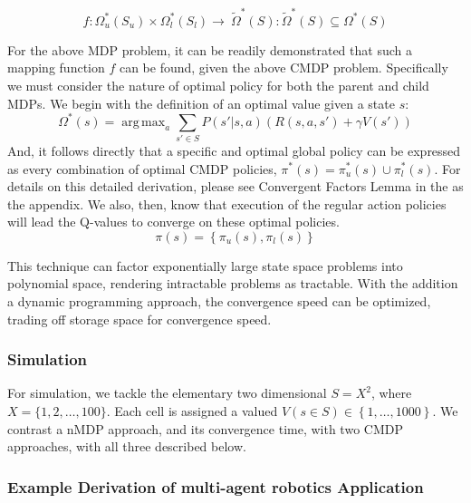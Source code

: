 \documentclass[compsoc,journal,letterpaper,10pt,draftcls,twocolumn]{IEEEtran}
\DeclareMathOperator*{\argmax}{arg\,max}
\begin{document}
\begin{equation}
f:\Omega_{u}^{*}\left( S_{u} \right) \times \Omega_{l}^{*}\left( S_{l} \right) \rightarrow \ {\tilde{\Omega}}^{*}\left( S \right):{\tilde{\Omega}}^{*}\left( S \right) \subseteq \Omega^{*}\left( S \right)
\end{equation}
 

For the above MDP problem, it can be readily demonstrated that such a
mapping function \(f\) can be found, given the above CMDP problem.
Specifically we must consider the nature of optimal policy for both the
parent and child MDPs. We begin with the definition of an optimal value
given a state \(s\):
\begin{equation}
\Omega^{*}(s) = \argmax_{a}\sum_{s' \in S}P\left( s'|s,a \right)\left( R\left( s, a, s' \right) + \gamma V\left( s' \right) \right)
\end{equation}
And, it follows directly that a specific and optimal global policy can
be expressed as every combination of optimal CMDP policies,
\(\pi^{*}\left( s \right) = \pi_{u}^{*}\left( s \right) \cup \pi_{l}^{*}\left( s \right)\).
For details on this detailed derivation, please see Convergent Factors
Lemma in the as the appendix. We also, then, know that execution of the
regular action policies will lead the Q-values to converge on these
optimal policies.
\begin{equation}
\pi\left( s \right) = \left\{ \pi_{u}\left( s \right),\pi_{l}\left( s \right) \right\}
\end{equation}

This technique can factor exponentially large state space problems into
polynomial space, rendering intractable problems as tractable. With the
addition a dynamic programming approach, the convergence speed can be
optimized, trading off storage space for convergence speed.

\subsubsection{Simulation}\label{simulation}

For simulation, we tackle the elementary two dimensional
\(S = X^{2}\), where \(X = \{ 1,2,\ldots,100\}\). Each cell is
assigned a valued
\(V\left( s \in S \right) \in \left\{ 1,\ldots,1000 \right\}\). We
contrast a nMDP approach, and its convergence time, with two CMDP
approaches, with all three described below.

\subsubsection{Example Derivation of multi-agent robotics
Application}\label{example-derivation-of-multi-agent-robotics-application}
\end{document}
